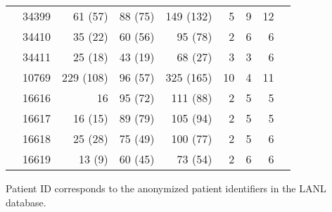 \documentclass[12pt]{article}
\begin{document}
\begin{table*}
\begin{center}
\begin{tabular}{llrrrrrrr}
& 34399 & 61 (57) & 88 (75) & 149 (132) & 5 & 9 & 12 \\
& 34410 & 35 (22) & 60 (56) & 95 (78) & 2 & 6 & 6 \\
& 34411 & 25 (18) & 43 (19) & 68 (27) & 3 & 3 & 6 \\
\cite{Fischer04} & 10769 & 229 (108) & 96 (57) & 325 (165) & 10 & 4 & 11 \\ 
\cite{Llewellyn06} & 16616 & 16 & 95 (72) & 111 (88) & 2 & 5 & 5 \\
& 16617 & 16 (15) & 89 (79) & 105 (94) & 2 & 5 & 5 \\
& 16618 & 25 (28) & 75 (49) & 100 (77) & 2 & 5 & 6 \\
& 16619 & 13 (9) & 60 (45) & 73 (54) & 2 & 6 & 6 \\
\hline
\end{tabular}
\end{center}
	Patient ID corresponds to the anonymized patient identifiers in the LANL database.
\end{table*}

\pagebreak{}
\end{document}
